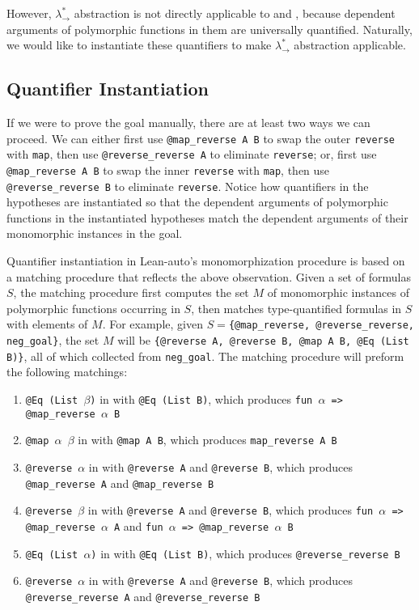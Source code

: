 However, $\lambda_\to^*$ abstraction is not directly applicable to \usebox{\vmaprev} and
\usebox{\vrevrev}, because dependent arguments of polymorphic functions in them are universally
quantified. Naturally, we would like to instantiate these quantifiers to make $\lambda_\to^*$
abstraction applicable.

\subsection{Quantifier Instantiation} \label{exinst}

If we were to prove the goal manually, there are at least two ways we can proceed. We can
either first use \texttt{@map\_reverse A B} to swap the outer \texttt{reverse} with \texttt{map}, then
use \texttt{@reverse\_reverse A} to eliminate \texttt{reverse}; or, first use
\texttt{@map\_reverse A B} to swap the inner \texttt{reverse} with \texttt{map}, then
use \texttt{@reverse\_reverse B} to eliminate \texttt{reverse}. Notice how quantifiers
in the hypotheses are instantiated so that the dependent arguments of polymorphic functions
in the instantiated hypotheses match the dependent arguments of their monomorphic instances in the goal.

Quantifier instantiation in Lean-auto's monomorphization procedure is based
on a matching procedure that reflects the above observation. Given a set of formulas $S$,
the matching procedure first computes the set $M$ of monomorphic instances of polymorphic functions occurring
in $S$, then matches type-quantified formulas in $S$ with elements of $M$. For example,
given $S=$\texttt{\{@map\_reverse, @reverse\_reverse, neg\_goal\}}, the set $M$ will be
\texttt{\{@reverse A, @reverse B, @map A B, @Eq (List B)\}}, all of which collected from \texttt{neg\_goal}.
The matching procedure will preform the following matchings:

\begin{enumerate}
  \item \texttt{@Eq (List $\beta$)} in \usebox{\vmaprev} with \texttt{@Eq (List B)},
    which produces \texttt{fun $\alpha$ => @map\_reverse $\alpha$ B}
  \item \texttt{@map $\alpha$ $\beta$} in \usebox{\vmaprev} with \texttt{@map A B},
    which produces \texttt{map\_reverse A B}
  \item \texttt{@reverse $\alpha$} in \usebox{\vmaprev} with \texttt{@reverse A} and \texttt{@reverse B},
    which produces \texttt{@map\_reverse A} and \texttt{@map\_reverse B}
  \item \texttt{@reverse $\beta$} in \usebox{\vmaprev} with \texttt{@reverse A} and \texttt{@reverse B},
    which produces \texttt{fun $\alpha$ => @map\_reverse $\alpha$ A} and \texttt{fun $\alpha$ => @map\_reverse $\alpha$ B}
  \item \texttt{@Eq (List $\alpha$)} in \usebox{\vrevrev} with \texttt{@Eq (List B)},
    which produces \texttt{@reverse\_reverse B}
  \item \texttt{@reverse $\alpha$} in \usebox{\vrevrev} with \texttt{@reverse A} and \texttt{@reverse B},
    which produces \texttt{@reverse\_reverse A} and \texttt{@reverse\_reverse B}
\end{enumerate}

